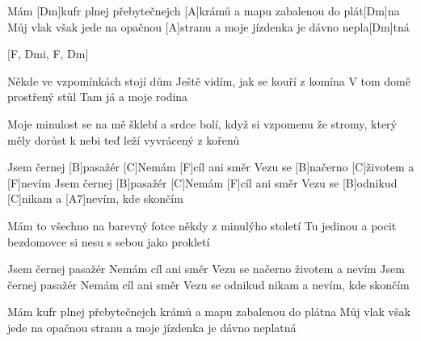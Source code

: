 
Mám [Dm]kufr plnej přebytečnejch [A]krámů 
a mapu zabalenou do plát[Dm]na 
Můj vlak však jede na opačnou [A]stranu 
a moje jízdenka je dávno nepla[Dm]tná 

[F, Dmi, F, Dm]

Někde ve vzpomínkách stojí dům 
Ještě vidím, jak se kouří z komína 
V tom domě prostřený stůl 
Tam já a moje rodina 

Moje minulost se na mě šklebí 
a srdce bolí, když si vzpomenu 
že stromy, který měly dorůst k nebi 
teď leží vyvrácený z kořenů 

Jsem černej [B]pasažér 
[C]Nemám [F]cíl ani směr 
Vezu se [B]načerno [C]\null životem a [F]nevím 
Jsem černej [B]pasažér 
[C]Nemám [F]cíl ani směr 
Vezu se [B]odnikud [C]nikam a [A7]nevím, kde skončím 

\slpc

Mám to všechno na barevný fotce 
někdy z minulýho století 
Tu jedinou a pocit bezdomovce 
si nesu s sebou jako prokletí 

Jsem černej pasažér 
Nemám cíl ani směr 
Vezu se načerno životem a nevím 
Jsem černej pasažér 
Nemám cíl ani směr 
Vezu se odnikud nikam a nevím, kde skončím  

Mám kufr plnej přebytečnejch krámů 
a mapu zabalenou do plátna 
Můj vlak však jede na opačnou stranu 
a moje jízdenka je dávno neplatná 